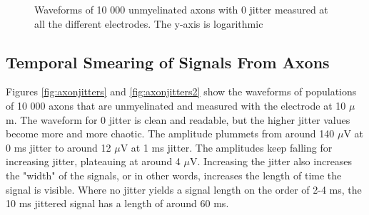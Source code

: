 \documentclass[final, a4paper,masters,en,listoffigures,listoftables,norwegiandates]{NMBU}
\begin{document}
\begin{figure}[h]
    \centering
    \caption{Waveforms of 10 000 unmyelinated axons with 0 jitter measured at all the different electrodes. The y-axis is logarithmic}
    \label{fig:axonmyenelecswav}
\end{figure}

\subsection{Temporal Smearing of Signals From Axons}
Figures \ref{fig:axonjitters} and \ref{fig:axonjitters2} show the waveforms of populations of 10 000 axons that are unmyelinated and measured with the electrode at 10 $\mu$m. The waveform for 0 jitter is clean and readable, but the higher jitter values become more and more chaotic. The amplitude plummets from around 140 $\mu$V at 0 ms jitter to around 12 $\mu$V at 1 ms jitter. The amplitudes keep falling for increasing jitter, plateauing at around 4 $\mu$V. Increasing the jitter also increases the "width" of the signals, or in other words, increases the length of time the signal is visible. Where no jitter yields a signal length on the order of 2-4 ms, the 10 ms jittered signal has a length of around 60 ms. 
\end{document}
